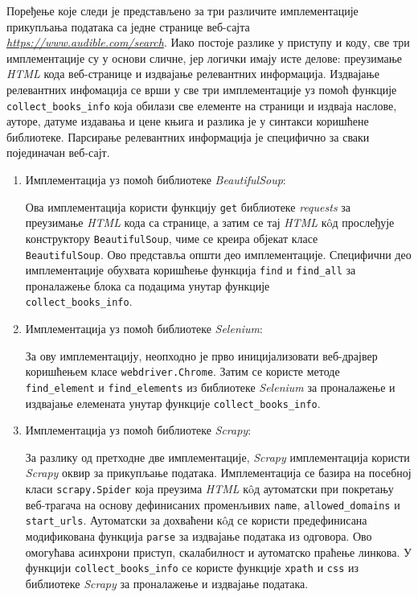 \documentclass[12pt,oneside]{memoir}
\begin{document}
Поређење које следи је представљено за три различите имплементације прикупљања података са једне странице веб-сајта\\ \textit{\href{https://www.audible.com/search}{https://www.audible.com/search}}. Иако постоје разлике у приступу и коду, све три имплементације су у основи сличне, јер логички имају исте делове: преузимање \textit{HTML} кода веб-странице и издвајање релевантних информација. Издвајање релевантних инфомација се врши у све три имплементације уз помоћ функције \texttt{collect\_books\_info} која обилази све елементе на страници и издваја наслове, ауторе, датуме издавања и цене књига и разлика је у синтакси коришћене библиотеке. Парсирање релевантних информација је специфично за сваки појединачан веб-сајт.

\begin{enumerate}
\item Имплементација уз помоћ библиотеке \textit{BeautifulSoup}:

Ова имплементација користи функцију \texttt{get} библиотеке \textit{requests} за преузимање \textit{HTML} кода са странице, а затим се тај \textit{HTML} кôд прослеђује конструктору \texttt{BeautifulSoup}, чиме се креира објекат класе \\ \texttt{BeautifulSoup}. Ово представља општи део имплементације. Специфични део имплементације обухвата коришћење функција \texttt{find} и \texttt{find\_all} за проналажење блока са подацима унутар функције\\ \texttt{collect\_books\_info}. 

\item Имплементација уз помоћ библиотеке \textit{Selenium}:

За ову имплементацију, неопходно је прво иницијализовати веб-драјвер коришћењем класе \texttt{webdriver.Chrome}. Затим се користе методе\\ \texttt{find\_element} и \texttt{find\_elements} из библиотеке \textit{Selenium} за проналажење и издвајање елемената унутар функције \texttt{collect\_books\_info}.

\item Имплементација уз помоћ библиотеке \textit{Scrapy}:

За разлику од претходне две имплементације, \textit{Scrapy} имплементација користи \textit{Scrapy} оквир за прикупљање података. Имплементација се базира на посебној класи \texttt{scrapy.Spider} која преузима \textit{HTML} кôд аутоматски при покретању веб-трагача на основу дефинисаних променљивих \texttt{name}, \texttt{allowed\_domains} и \texttt{start\_urls}. Аутоматски за дохваћени кôд се користи предефинисана модификована функција \texttt{parse} за издвајање података из одговора. Ово омогућава асинхрони приступ, скалабилност и аутоматско праћење линкова. У функцији \texttt{collect\_books\_info} се користе функције \texttt{xpath} и \texttt{css} из библиотеке \textit{Scrapy} за проналажење и издвајање података.

\end{enumerate}
\end{document}
